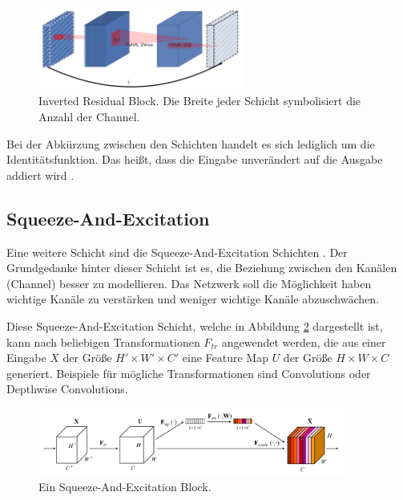 \begin{figure}[htbp]
\centerline{\includegraphics[width=0.6\textwidth]{content/images/inverted_residual.png}}
\caption{Inverted Residual Block. Die Breite jeder Schicht symbolisiert die Anzahl der Channel. \cite{sandler_mobilenetv2_2019}}
\label{f2.5}
\end{figure}

Bei der Abkürzung zwischen den Schichten handelt es sich lediglich um die Identitäts\-funktion. Das heißt, dass die Eingabe unverändert auf die Ausgabe addiert wird \cite{sandler_mobilenetv2_2019}.


\subsection{Squeeze-And-Excitation}
\label{squeeze_and_excitation}
Eine weitere Schicht sind die Squeeze-And-Excitation Schichten \cite{hu_squeeze-and-excitation_2019}. Der Grundgedanke hinter dieser Schicht ist es, die Beziehung zwischen den Kanälen (Channel) besser zu modellieren. Das Netzwerk soll die Möglichkeit haben wichtige Kanäle zu verstärken und weniger wichtige Kanäle abzuschwächen.

Diese Squeeze-And-Excitation Schicht, welche in Abbildung \ref{f2.6} dargestellt ist, kann nach beliebigen Transformationen $F_{tr}$ angewendet werden, die aus einer Eingabe $X$ der Größe $H' \times W' \times C'$ eine Feature Map $U$ der Größe $H \times W \times C$ generiert. Beispiele für mögliche Transformationen sind Convolutions oder Depthwise Convolutions.

\begin{figure}[htbp]
\centerline{\includegraphics[width=0.9\textwidth]{content/images/squeeze_and_excitation.png}}
\caption{Ein Squeeze-And-Excitation Block. \cite{hu_squeeze-and-excitation_2019}}
\label{f2.6}
\end{figure}

